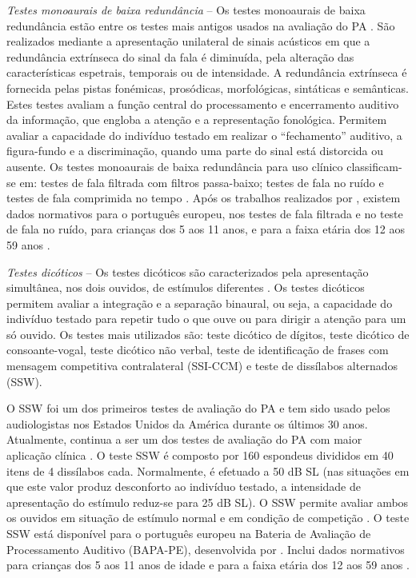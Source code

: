\documentclass[output=paper,colorlinks,citecolor=brown,booklanguage=portuguese]{langscibook}
\begin{document}
\emph{Testes monoaurais de baixa redundância} – Os testes monoaurais de baixa redundância estão entre os testes mais antigos usados na avaliação do PA \citep{Bocca1954}. São realizados mediante a apresentação unilateral de sinais acústicos em que a redundância extrínseca do sinal da fala é diminuída, pela alteração das características espetrais, temporais ou de intensidade. A redundância extrínseca é fornecida pelas pistas fonémicas, prosódicas, morfológicas, sintáticas e semânticas. Estes testes avaliam a função central do processamento e encerramento auditivo da informação, que engloba a atenção e a representação fonológica. Permitem avaliar a capacidade do indivíduo testado em realizar o “fechamento” auditivo, a figura-fundo e a discriminação, quando uma parte do sinal está distorcida ou ausente. Os testes monoaurais de baixa redundância para uso clínico classificam-se em: testes de fala filtrada com filtros passa-baixo; testes de fala no ruído e testes de fala comprimida no tempo \citep{Krishnamurti2007}. Após os trabalhos realizados por \citep{Martins2017b}, existem dados normativos para o português europeu, nos testes de fala filtrada e no teste de fala no ruído, para crianças dos 5 aos 11 anos, e para a faixa etária dos 12 aos 59 anos \citep{Martins2017b}.

\emph{Testes dicóticos} – Os testes dicóticos são caracterizados pela apresentação simultânea, nos dois ouvidos, de estímulos diferentes \citep{Bellis2003}. Os testes dicóticos permitem avaliar a integração e a separação binaural, ou seja, a capacidade do indivíduo testado para repetir tudo o que ouve ou para dirigir a atenção para um só ouvido. Os testes mais utilizados são: teste dicótico de dígitos, teste dicótico de consoante-vogal, teste dicótico não verbal, teste de identificação de frases com mensagem competitiva contralateral (SSI-CCM) e teste de dissílabos alternados (SSW).

O SSW foi um dos primeiros testes de avaliação do PA e tem sido usado pelos audiologistas nos Estados Unidos da América durante os últimos 30 anos. Atualmente, continua a ser um dos testes de avaliação do PA com maior aplicação clínica \citep{Musiek1987, Musiek2001}. O teste SSW é composto por 160 espondeus divididos em 40 itens de 4 dissílabos cada. Normalmente, é efetuado a 50 dB SL (nas situações em que este valor produz desconforto ao indivíduo testado, a intensidade de apresentação do estímulo reduz-se para 25 dB SL). O SSW permite avaliar ambos os ouvidos em situação de estímulo normal e em condição de competição \citep{Katz1962, Katz1963, Katz1968}. O teste SSW está disponível para o português europeu na Bateria de Avaliação de Processamento Auditivo (BAPA-PE), desenvolvida por \citeauthor{Martins2018a} \citep{Martins2018a}. Inclui dados normativos para crianças dos 5 aos 11 anos de idade e para a faixa etária dos 12 aos 59 anos \citep{Martins2017b, Martins2008, Martins2014}.
\end{document}
